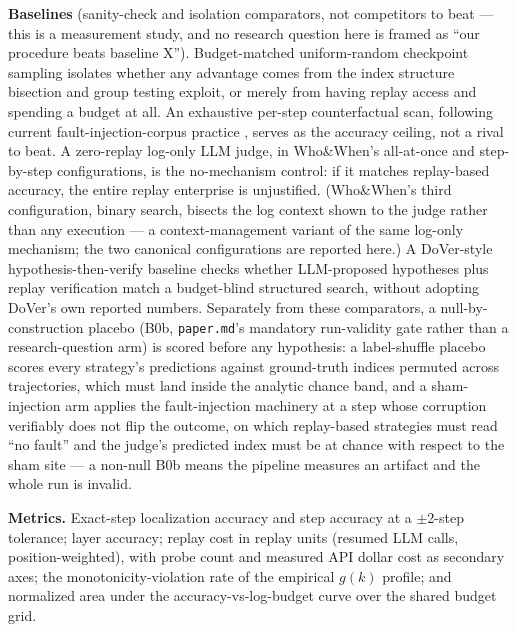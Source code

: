 \documentclass[11pt]{article}
\begin{document}
\textbf{Baselines} (sanity-check and isolation comparators, not competitors to beat --- this is a measurement study, and no research question here is framed as ``our procedure beats baseline X''). Budget-matched uniform-random checkpoint sampling isolates whether any advantage comes from the index structure bisection and group testing exploit, or merely from having replay access and spending a budget at all. An exhaustive per-step counterfactual scan, following current fault-injection-corpus practice \citep{AgenTracer2025}, serves as the accuracy ceiling, not a rival to beat. A zero-replay log-only LLM judge, in Who\&When's \citep{WhoWhen2025} all-at-once and step-by-step configurations, is the no-mechanism control: if it matches replay-based accuracy, the entire replay enterprise is unjustified. (Who\&When's third configuration, binary search, bisects the log context shown to the judge rather than any execution --- a context-management variant of the same log-only mechanism; the two canonical configurations are reported here.) A DoVer-style \citep{DoVer2025} hypothesis-then-verify baseline checks whether LLM-proposed hypotheses plus replay verification match a budget-blind structured search, without adopting DoVer's own reported numbers. Separately from these comparators, a null-by-construction placebo (B0b, \texttt{paper.md}'s mandatory run-validity gate rather than a research-question arm) is scored before any hypothesis: a label-shuffle placebo scores every strategy's predictions against ground-truth indices permuted across trajectories, which must land inside the analytic chance band, and a sham-injection arm applies the fault-injection machinery at a step whose corruption verifiably does not flip the outcome, on which replay-based strategies must read ``no fault'' and the judge's predicted index must be at chance with respect to the sham site --- a non-null B0b means the pipeline measures an artifact and the whole run is invalid.

\textbf{Metrics.} Exact-step localization accuracy and step accuracy at a $\pm$2-step tolerance; layer accuracy; replay cost in replay units (resumed LLM calls, position-weighted), with probe count and measured API dollar cost as secondary axes; the monotonicity-violation rate of the empirical $g(k)$ profile; and normalized area under the accuracy-vs-log-budget curve over the shared budget grid.
\end{document}
